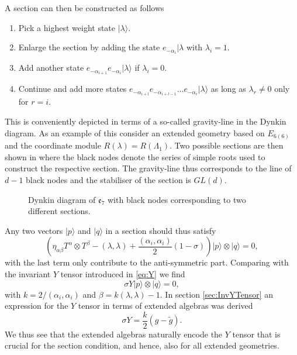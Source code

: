 A section can then be constructed as follows 
\begin{enumerate}
    \item Pick a highest weight state $|\lambda\rangle$.
    \item Enlarge the section by adding the state $e_{-\alpha_i}|\lambda$ with $\lambda_i=1$.
    \item Add another state $e_{-\alpha_{i+1}}e_{-\alpha_{i}}|\lambda\rangle$ if $\lambda_i=0$. 
    \item Continue and add more states $e_{-\alpha_{i+l}}e_{-\alpha_{i+l-1}}\ldots e_{-\alpha_{i}}|\lambda\rangle$ as long as $\lambda_{r}\neq 0$ only for $r=i$.
\end{enumerate}
This is conveniently depicted in terms of a so-called gravity-line in the Dynkin diagram. As an example of this consider an extended geometry based on $E_{6(6)}$ and the coordinate module $R(\lambda)=R(\Lambda_1)$. Two possible sections are then shown in  where the black nodes denote the series of simple roots used to construct the respective section. The gravity-line thus corresponds to the line of $d-1$ black nodes and the stabiliser of the section is $GL(d)$. 

\begin{figure}
    \caption{Dynkin diagram of $\mathfrak{e}_7$ with black nodes corresponding to two different sections.}
    \label{fig:E7WithSection}
\end{figure}

Any two vectors $|p\rangle$ and $|q\rangle$ in a section should thus satisfy 
\begin{equation}
    \left(\eta_{\alpha\beta}T^\alpha\otimes T^\beta-(\lambda,\lambda)+\frac{(\alpha_i,\alpha_i)}{2}(1-\sigma)\right)|p\rangle\otimes|q\rangle = 0,
\end{equation}
with the last term only contribute to the anti-symmetric part. Comparing with the invariant $Y$ tensor introduced in \eqref{eq:Y} we find 
\begin{equation}
    \sigma Y|p\rangle\otimes|q\rangle = 0,
\end{equation}
with $k=2/(\alpha_i,\alpha_i)$ and $\beta=k(\lambda,\lambda)-1$. In section \ref{sec:InvYTensor} an expression for the $Y$ tensor in terms of extended algebras was derived  
\begin{equation}
    \sigma Y = \frac{k}{2}(g-\tilde{g}).
\end{equation}
We thus see that the extended algebras naturally encode the $Y$ tensor that is crucial for the section condition, and hence, also for all extended geometries. 

